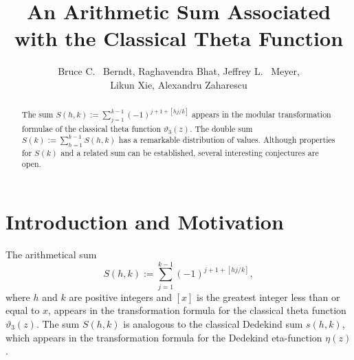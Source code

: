\documentclass[11pt,reqno]{amsart}
\theoremstyle{plain}
\numberwithin{equation}{section}
\begin{document}
\title[An Arithmetic Sum Associated with the Classical Theta Function]{An Arithmetic Sum Associated \\with the Classical Theta Function}
\author[B.~C.~Berndt, R.~Bhat, J.~Meyer, L.~Xie, A.~Zaharescu]{Bruce C.~ Berndt, Raghavendra Bhat, Jeffrey L.~ Meyer,\\Likun Xie,  Alexandru Zaharescu}
\address{Department of Mathematics, University of Illinois, 1409 West Green
Street, Urbana, IL 61801, USA} 
\address{Department of Mathematics, University of Illinois, 1409 West Green
Street, Urbana, IL 61801, USA} 
\address{Department of Mathematics, 215 Carnegie Library, Syracuse University,
Syracuse, NY 13244, USA} 
\address{Max-Planck-Institut f\"{u}r Mathematik, Vivatsgasse 7, 53111, Bonn, Germany} 
\address{Department of Mathematics, University of Illinois, 1409 West Green
Street, Urbana, IL 61801, USA; Institute of Mathematics of the Romanian
Academy, P.O.~Box 1-764, Bucharest RO-70700, Romania}


\begin{abstract}
The sum $S(h,k):=\sum_{j=1}^{k-1}(-1)^{j+1+[hj/k]}$ appears in the modular transformation formulae of the classical theta function $\vartheta_3(z)$. The double sum
$S(k) := \sum_{h=1}^{k-1}S(h,k)$ has a remarkable distribution of values.  Although properties for $S(k)$ and a related sum can be established, several interesting conjectures are open.
\end{abstract}




\maketitle

\section{Introduction and Motivation}\label{section1} The arithmetical sum
\begin{equation}\label{defSkh}
S(h,k) := \sum_{j=1}^{k-1}(-1)^{j+1+[hj/k]},
\end{equation}
where $h$ and $k$ are positive integers and $[x]$ is the greatest integer less than or equal to $x$, appears in the transformation formula for the classical theta function $\vartheta_3(z)$. The sum $S(h,k)$ is analogous to the classical Dedekind sum $s(h,k)$, which appears in the transformation formula for the Dedekind eta-function $\eta(z)$.
\end{document}
